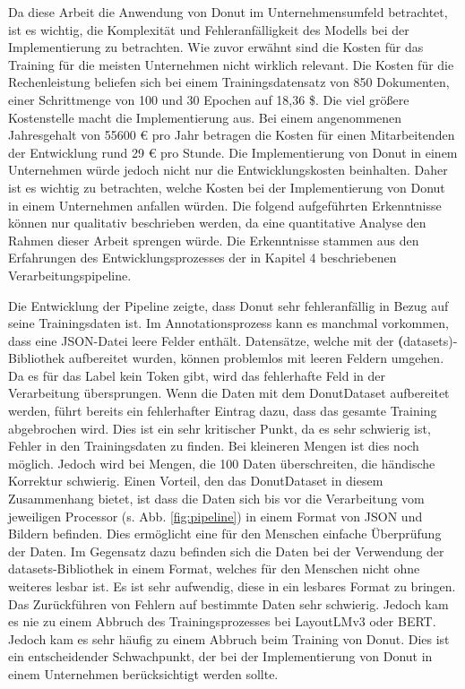 Da diese Arbeit die Anwendung von Donut im Unternehmensumfeld betrachtet, ist es wichtig, die Komplexität und Fehleranfälligkeit des Modells bei der Implementierung zu betrachten. Wie zuvor erwähnt sind die Kosten für das Training für die meisten Unternehmen nicht wirklich relevant. Die Kosten für die Rechenleistung beliefen sich bei einem Trainingsdatensatz von 850 Dokumenten, einer Schrittmenge von 100 und 30 Epochen auf 18,36 \$. Die viel größere Kostenstelle macht die Implementierung aus. Bei einem angenommenen Jahresgehalt von 55600 € pro Jahr betragen die Kosten für einen Mitarbeitenden der Entwicklung rund 29 € pro Stunde. Die Implementierung von Donut in einem Unternehmen würde jedoch nicht nur die Entwicklungskosten beinhalten. Daher ist es wichtig zu betrachten, welche Kosten bei der Implementierung von Donut in einem Unternehmen anfallen würden. Die folgend aufgeführten Erkenntnisse können nur qualitativ beschrieben werden, da eine quantitative Analyse den Rahmen dieser Arbeit sprengen würde. Die Erkenntnisse stammen aus den Erfahrungen des Entwicklungsprozesses der in Kapitel 4 beschriebenen Verarbeitungspipeline.

Die Entwicklung der Pipeline zeigte, dass Donut sehr fehleranfällig in Bezug auf seine Trainingsdaten ist. Im Annotationsprozess kann es manchmal vorkommen, dass eine JSON-Datei leere Felder enthält. Datensätze, welche mit der \textbf(datasets)-Bibliothek aufbereitet wurden, können problemlos mit leeren Feldern umgehen. Da es für das Label kein Token gibt, wird das fehlerhafte Feld in der Verarbeitung übersprungen. Wenn die Daten mit dem DonutDataset aufbereitet werden, führt bereits ein fehlerhafter Eintrag dazu, dass das gesamte Training abgebrochen wird. Dies ist ein sehr kritischer Punkt, da es sehr schwierig ist, Fehler in den Trainingsdaten zu finden. Bei kleineren Mengen ist dies noch möglich. Jedoch wird bei Mengen, die 100 Daten überschreiten, die händische Korrektur schwierig. Einen Vorteil, den das DonutDataset in diesem Zusammenhang bietet, ist dass die Daten sich bis vor die Verarbeitung vom jeweiligen Processor (s. Abb. \ref{fig:pipeline}) in einem Format von JSON und Bildern befinden. Dies ermöglicht eine für den Menschen einfache Überprüfung der Daten. Im Gegensatz dazu befinden sich die Daten bei der Verwendung der datasets-Bibliothek in einem Format, welches für den Menschen nicht ohne weiteres lesbar ist. Es ist sehr aufwendig, diese in ein lesbares Format zu bringen. Das Zurückführen von Fehlern auf bestimmte Daten sehr schwierig. Jedoch kam es nie zu einem Abbruch des Trainingsprozesses bei LayoutLMv3 oder BERT. Jedoch kam es sehr häufig zu einem Abbruch beim Training von Donut. Dies ist ein entscheidender Schwachpunkt, der bei der Implementierung von Donut in einem Unternehmen berücksichtigt werden sollte.

